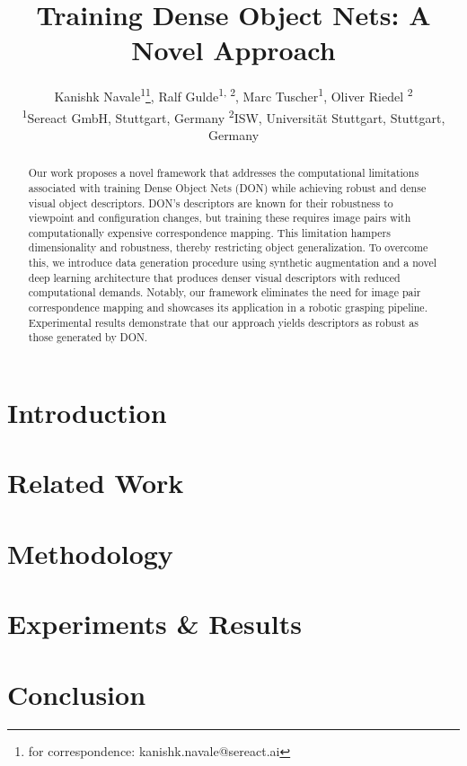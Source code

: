\documentclass{article}
\title{Training Dense Object Nets: A Novel Approach}
\author{%
  Kanishk Navale\textsuperscript{1}\thanks{for correspondence: kanishk.navale@sereact.ai}, \quad
  Ralf Gulde\textsuperscript{1, 2}, \quad
  Marc Tuscher\textsuperscript{1}, \quad
  Oliver Riedel \textsuperscript{2}\\
  \textsuperscript{1}Sereact GmbH, Stuttgart, Germany \quad
  \textsuperscript{2}ISW, Universität Stuttgart, Stuttgart, Germany\\
}
\begin{document}
\maketitle

\begin{abstract}
  Our work proposes a novel framework that addresses the computational limitations associated with training Dense Object Nets (DON)
  while achieving robust and dense visual object descriptors. DON's descriptors are known for their robustness to
  viewpoint and configuration changes, but training these requires image pairs with computationally expensive correspondence mapping.
  This limitation hampers dimensionality and robustness, thereby restricting object generalization.
  To overcome this, we introduce data generation procedure using synthetic augmentation and a novel deep learning architecture
  that produces denser visual descriptors with reduced computational demands. Notably, our framework eliminates the need for
  image pair correspondence mapping and showcases its application in a robotic grasping pipeline.
  Experimental results demonstrate that our approach yields descriptors as robust as those generated by DON.
\end{abstract}

\section{Introduction}


\section{Related Work}


\section{Methodology}


\section{Experiments \& Results}


\section{Conclusion}



\printbibliography
\end{document}
